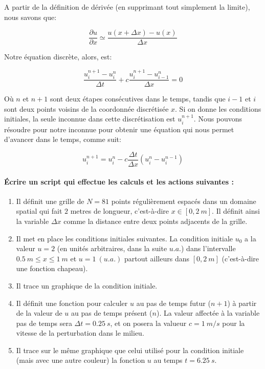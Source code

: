 \documentclass{article}
\begin{document}
A partir de la définition de dérivée (en supprimant tout simplement la
limite), nous savons que:

\[\frac{\partial u}{\partial x} \simeq \frac{u(x+\Delta x) - u(x)}{\Delta x} \]

Notre équation discrète, alors, est:

\[\frac{u_i^{n+1} - u_i^{n}}{\Delta t} + c \frac{u_i^{n+1} - u_{i-1}^{n}}{\Delta x} = 0\]

Où \(n\) et \(n + 1\) sont deux étapes consécutives dans le temps,
tandis que \(i-1\) et \(i\) sont deux points voisins de la coordonnée
discrétisée \(x\). Si on donne les conditions initiales, la seule
inconnue dans cette discrétisation est \(u_i^{n+1}\). Nous pouvons
résoudre pour notre inconnue pour obtenir une équation qui nous permet
d'avancer dans le temps, comme suit:

\[u_i^{n+1} = u_i^{n} - c \frac{\Delta t}{\Delta x}(u_i^{n} - u_i^{n-1})\]


    \paragraph{Écrire un script qui effectue les calculs et les actions suivantes :}


    \begin{enumerate}
\def\labelenumi{\arabic{enumi})}
\item
  Il définit une grille de \(N=81\) points régulièrement espacés dans un
  domaine spatial qui fait \(2\) metres de longueur, c'est-à-dire
  \(x \in [0,2\ m]\). Il définit ainsi la variable \(\Delta x\) comme la
  distance entre deux points adjacents de la grille.
\item
  Il met en place les conditions initiales suivantes. La condition
  initiale \(u_0\) a la valeur \(u = 2\) (en unités arbitraires, dans la
  suite \(u.a.\)) dans l'intervalle \(0.5 \ m ≤ x ≤ 1 \ m\) et
  \(u = 1 \ (u.a.)\) partout ailleurs dans \([0,2\ m]\) (c'est-à-dire
  une fonction chapeau).
\item
  Il trace un graphique de la condition initiale.
\item
  Il définit une fonction pour calculer \(u\) au pas de temps futur
  (\(n+1\)) à partir de la valeur de \(u\) au pas de temps présent
  (\(n\)). La valeur affectée à la variable pas de temps sera $\Delta t
  = 0.25~s $, et on posera la valueur $c = 1 ~m /s $ pour la vitesse
  de la perturbation dans le milieu.
\item
  Il trace sur le même graphique que celui utilisé pour la condition
  initiale (mais avec une autre couleur) la fonction \(u\) au temps
  \(t=6.25\ s\).
\end{enumerate}
\end{document}
